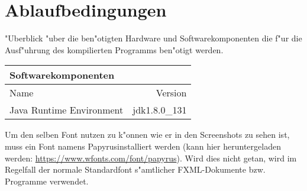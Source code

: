 \section{Ablaufbedingungen}
"Uberblick "uber die ben"otigten Hardware und Softwarekomponenten die f"ur die Ausf"uhrung des kompilierten Programms ben"otigt werden. 

\begin{table}[h!]
	\begin{tabular}{lr} 
	\toprule
	Softwarekomponenten\\  
	\midrule 
	Name & Version\\ 
	\midrule 
	Java Runtime Environment & jdk1.8.0\_131\\ 
	\bottomrule
	\end{tabular}
	\label{tab:ablaufbedingungen}
\end{table}

Um den selben Font nutzen zu k"onnen wie er in den Screenshots zu sehen ist, muss ein Font namens \glqq Papyrus\grqq installiert werden (kann hier heruntergeladen werden: \url{https://www.wfonts.com/font/papyrus}). Wird dies nicht getan, wird im Regelfall der normale Standardfont s"amtlicher FXML-Dokumente bzw. Programme verwendet. 
